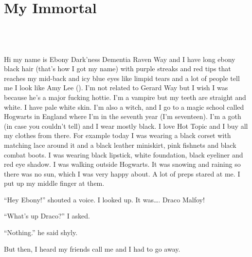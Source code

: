 \cleardoublepage\chapter{My Immortal}

\section{\chaptername~\thesection}


\XXX{\Xfill}

Hi my name is Ebony Dark'ness Dementia Raven Way and I have long ebony black hair (that's how I got my name) with purple streaks and red tips that reaches my mid-back and icy blue eyes like limpid tears and a lot of people tell me I look like Amy Lee (). I'm not related to Gerard Way but I wish I was because he's a major fucking hottie. I'm a vampire but my teeth are straight and white. I have pale white skin. I'm also a witch, and I go to a magic school called Hogwarts in England where I'm in the seventh year (I'm seventeen). I'm a goth (in case you couldn't tell) and I wear mostly black. I love Hot Topic and I buy all my clothes from there. For example today I was wearing a black corset with matching lace around it and a black leather miniskirt, pink fishnets and black combat boots. I was wearing black lipstick, white foundation, black eyeliner and red eye shadow. I was walking outside Hogwarts. It was snowing and raining so there was no sun, which I was very happy about. A lot of preps stared at me. I put up my middle finger at them.

\enquote{Hey Ebony!} shouted a voice. I looked up. It was…. Draco Malfoy!

\enquote{What's up Draco?} I asked.

\enquote{Nothing.} he said shyly.

But then, I heard my friends call me and I had to go away.

\XXX{\Xfill}


